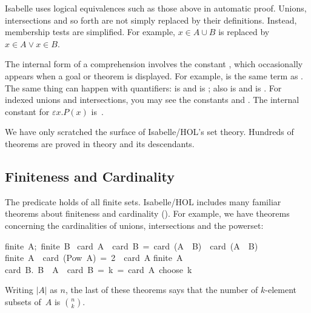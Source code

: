 Isabelle uses logical equivalences such as those above in automatic proof. 
Unions, intersections and so forth are not simply replaced by their
definitions.  Instead, membership tests are simplified.  For example,  $x\in
A\cup B$ is replaced by $x\in A\lor x\in B$.

The internal form of a comprehension involves the constant  
,
which occasionally appears when a goal or theorem
is displayed.  For example,   is the same term as
.  The same thing can
happen with quantifiers:   \hbox{}
is 
 and 
\hbox{} is ; 
also  is 
 and 
 is 
.  For indexed unions and
intersections, you may see the constants 
 and  \@.
The internal constant for $\varepsilon x.P(x)$ is~.

We have only scratched the surface of Isabelle/HOL's set theory. 
Hundreds of theorems are proved in theory  and its
descendants.


\subsection{Finiteness and Cardinality}

%
The predicate  holds of all finite sets.  Isabelle/HOL
includes many familiar theorems about finiteness and cardinality 
(). For example, we have theorems concerning the
cardinalities of unions, intersections and the
powerset:
%
\begin{isabelle}
{\isasymlbrakk}finite\ A;\ finite\ B\isasymrbrakk\isanewline
\isasymLongrightarrow\ card\ A\ \isacharplus\ card\ B\ =\ card\ (A\ \isasymunion\ B)\ \isacharplus\ card\ (A\ \isasyminter\ B)
%
\isanewline
\isanewline
finite\ A\ \isasymLongrightarrow\ card\
(Pow\ A)\  =\ 2\ \isacharcircum\ card\ A%
%
\isanewline
\isanewline
finite\ A\ \isasymLongrightarrow\isanewline
card\ \isacharbraceleft B.\ B\ \isasymsubseteq\
A\ \isasymand\ card\ B\ =\
k\isacharbraceright\ =\ card\ A\ choose\ k%
\rulename{n_subsets}
\end{isabelle}
Writing $|A|$ as $n$, the last of these theorems says that the number of
$k$-element subsets of~$A$ is 
$\binom{n}{k}$.

